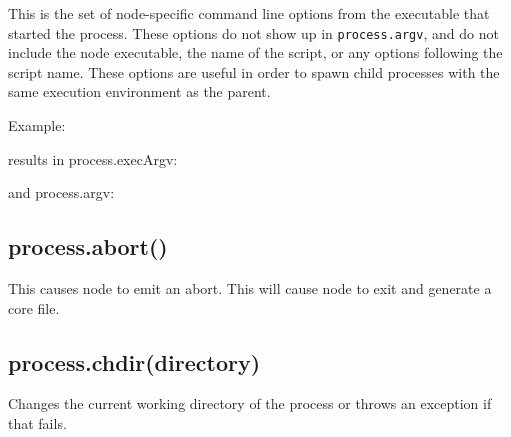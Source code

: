 This is the set of node-specific command line options from the
executable that started the process. These options do not show up in
\texttt{process.argv}, and do not include the node executable, the name
of the script, or any options following the script name. These options
are useful in order to spawn child processes with the same execution
environment as the parent.

Example:

\begin{Shaded}
\begin{Highlighting}[]
 
\end{Highlighting}
\end{Shaded}

results in process.execArgv:

\begin{Shaded}
\begin{Highlighting}[]
\NormalTok{[}\NormalTok{]}
\end{Highlighting}
\end{Shaded}

and process.argv:

\begin{Shaded}
\begin{Highlighting}[]
\NormalTok{[}\NormalTok{, }\NormalTok{, }\NormalTok{]}
\end{Highlighting}
\end{Shaded}

\subsection{process.abort()}

This causes node to emit an abort. This will cause node to exit and
generate a core file.

\subsection{process.chdir(directory)}

Changes the current working directory of the process or throws an
exception if that fails.

\begin{Shaded}
\begin{Highlighting}[]
\NormalTok{(} \NormalTok{+ }\NormalTok{());}
 \NormalTok{\{}
  \NormalTok{(}\NormalTok{);}
  \NormalTok{(} \NormalTok{+ }\NormalTok{());}
\NormalTok{\}}
 
  \NormalTok{(} 
\NormalTok{\}}
\end{Highlighting}
\end{Shaded}

